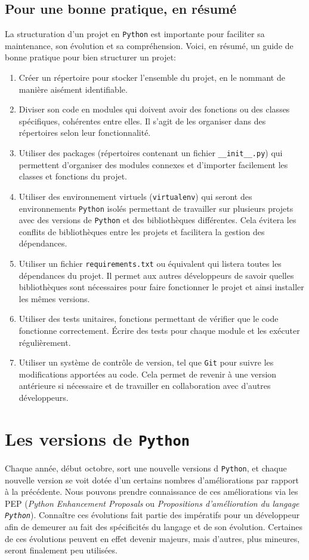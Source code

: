\documentclass[a4paper,12pt]{book}
\begin{document}
\section{Pour une bonne pratique, en résumé}
La structuration d'un projet en \texttt{Python} est importante pour faciliter sa maintenance, son évolution et sa compréhension. Voici, en résumé, un guide de bonne pratique pour bien structurer un projet:
\begin{enumerate}
	\item Créer un répertoire pour stocker l'ensemble du projet, en le nommant de manière aisément identifiable.
	\item Diviser son code en modules qui doivent avoir des fonctions ou des classes spécifiques, cohérentes entre elles. Il s'agit de les organiser dans des répertoires selon leur fonctionnalité.
	\item Utiliser des packages (répertoires contenant un fichier \texttt{\_\_init\_\_.py}) qui permettent d'organiser des modules connexes et d'importer facilement les classes et fonctions du projet.
	\item Utiliser des environnement virtuels (\texttt{virtualenv}) qui seront des environnements \texttt{Python} isolés permettant de travailler sur plusieurs projets avec des versions de \texttt{Python} et des bibliothèques différentes. Cela évitera les conflits de bibliothèques entre les projets et facilitera la gestion des dépendances.
	\item Utiliser un fichier \texttt{requirements.txt} ou équivalent qui listera toutes les dépendances du projet. Il permet aux autres développeurs de savoir quelles bibliothèques sont nécessaires pour faire fonctionner le projet et ainsi installer les mêmes versions.
	\item Utiliser des tests unitaires, fonctions permettant de vérifier que le code fonctionne correctement. Écrire des tests pour chaque module et les exécuter régulièrement.
	\item Utiliser un système de contrôle de version, tel que \texttt{Git} pour suivre les modifications apportées au code. Cela permet de revenir à une version antérieure si nécessaire et de travailler en collaboration avec d'autres développeurs.
\end{enumerate}
\medskip

\chapter{Les versions de \texttt{Python}}
Chaque année, début octobre, sort une nouvelle versions d \texttt{Python}, et chaque nouvelle version se voit dotée d'un certains nombres d'améliorations par rapport à la précédente. Nous pouvons prendre connaissance de ces améliorations via les PEP (\textit{Python Enhancement Proposals} ou \textit{Propositions d'amélioration du langage \texttt{Python}}). Connaître ces évolutions fait partie des impératifs pour un développeur afin de demeurer au fait des spécificités du langage et de son évolution. Certaines de ces évolutions peuvent en effet devenir majeurs, mais d'autres, plus mineures, seront finalement peu utilisées.
\medskip
\end{document}
